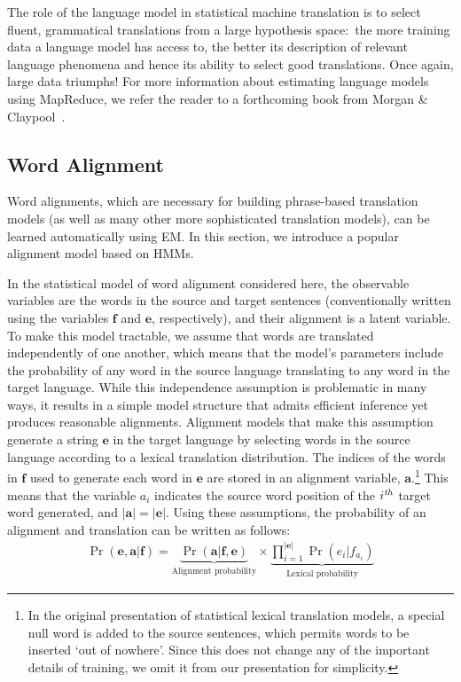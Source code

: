 The role of the language model in statistical machine translation is
to select fluent, grammatical translations from a large hypothesis
space:\ the more training data a language model has access to, the
better its description of relevant language phenomena and hence its
ability to select good translations.  Once again, large data triumphs!
For more information about estimating language models using MapReduce,
we refer the reader to a forthcoming book from Morgan \&
Claypool~\cite{Brants_2010}.

\subsection{Word Alignment}

Word alignments, which are necessary for building phrase-based
translation models (as well as many other more sophisticated
translation models), can be learned automatically using EM.  In this
section, we introduce a popular alignment model based on HMMs.

In the statistical model of word alignment considered here, the
observable variables are the words in the source and target sentences
(conventionally written using the variables $\textbf{f}$ and
$\textbf{e}$, respectively), and their alignment is a latent variable.
To make this model tractable, we assume that words are translated
independently of one another, which means that the model's parameters
include the probability of any word in the source language translating
to any word in the target language.  While this independence
assumption is problematic in many ways, it results in a simple model
structure that admits efficient inference yet produces reasonable
alignments.  Alignment models that make this assumption generate a
string $\textbf{e}$ in the target language by selecting words in the
source language according to a lexical translation distribution.  The
indices of the words in $\textbf{f}$ used to generate each word in
$\textbf{e}$ are stored in an alignment variable,
$\textbf{a}$.\footnote{In the original presentation of statistical
  lexical translation models, a special null word is added to the
  source sentences, which permits words to be inserted `out of
  nowhere'.  Since this does not change any of the important details
  of training, we omit it from our presentation for simplicity.} This
means that the variable $a_i$ indicates the source word position of
the $i^{\textrm{\emph{th}}}$ target word generated, and $|\textbf{a}|
= |\textbf{e}|$.  Using these assumptions, the probability of an
alignment and translation can be written as follows:
\begin{eqnarray}
\Pr(\textbf{e}, \textbf{a} | \textbf{f}) =  \underbrace{  \Pr(\textbf{a} | \textbf{f} , \textbf{e}) }_{\textrm{Alignment probability}} \times  \underbrace{ \prod_{i=1}^{|\textbf{e}|} \Pr(e_i|f_{a_i}) }_{\textrm{Lexical probability}}
\end{eqnarray}

